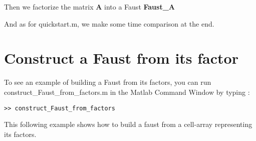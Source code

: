 \lstset{style=customBash}

Then we factorize the matrix \textbf{A} into a Faust \textbf{Faust\_A}

And as for quickstart.m, we make some time comparison at the end.

\newpage
\section{Construct a Faust from its factor}\label{sec:firstUseBuildFactors}
To see an example of building a Faust from its factors, you can run construct\_Faust\_from\_factors.m in the Matlab Command Window by typing :
\lstset{style=customMatlab}
\begin{lstlisting}
>> construct_Faust_from_factors
\end{lstlisting}
This following example shows how to build a faust from a cell-array representing its factors.



 
